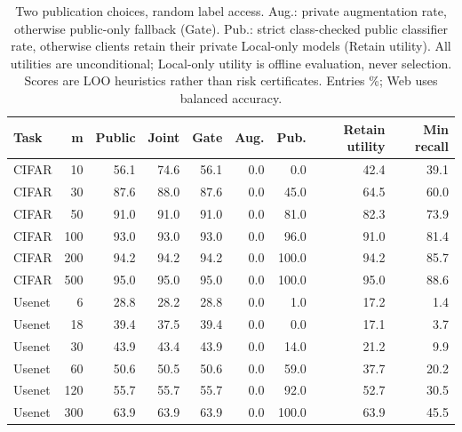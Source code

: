 \begin{table}[t]
\caption{Two publication choices, random label access. Aug.: private augmentation rate, otherwise public-only fallback (Gate). Pub.: strict class-checked public classifier rate, otherwise clients retain their private Local-only models (Retain utility). All utilities are unconditional; Local-only utility is offline evaluation, never selection. Scores are LOO heuristics rather than risk certificates. Entries \%; Web uses balanced accuracy.}
\label{tab:publication-gate}\small
\centering
\begin{tabular}{@{}lrrrrrrrr@{}}\toprule
Task & m & Public & Joint & Gate & Aug. & Pub. & Retain utility & Min recall \\
\midrule
CIFAR & 10 & 56.1 & 74.6 & 56.1 & 0.0 & 0.0 & 42.4 & 39.1 \\
CIFAR & 30 & 87.6 & 88.0 & 87.6 & 0.0 & 45.0 & 64.5 & 60.0 \\
CIFAR & 50 & 91.0 & 91.0 & 91.0 & 0.0 & 81.0 & 82.3 & 73.9 \\
CIFAR & 100 & 93.0 & 93.0 & 93.0 & 0.0 & 96.0 & 91.0 & 81.4 \\
CIFAR & 200 & 94.2 & 94.2 & 94.2 & 0.0 & 100.0 & 94.2 & 85.7 \\
CIFAR & 500 & 95.0 & 95.0 & 95.0 & 0.0 & 100.0 & 95.0 & 88.6 \\
Usenet & 6 & 28.8 & 28.2 & 28.8 & 0.0 & 1.0 & 17.2 & 1.4 \\
Usenet & 18 & 39.4 & 37.5 & 39.4 & 0.0 & 0.0 & 17.1 & 3.7 \\
Usenet & 30 & 43.9 & 43.4 & 43.9 & 0.0 & 14.0 & 21.2 & 9.9 \\
Usenet & 60 & 50.6 & 50.5 & 50.6 & 0.0 & 59.0 & 37.7 & 20.2 \\
Usenet & 120 & 55.7 & 55.7 & 55.7 & 0.0 & 92.0 & 52.7 & 30.5 \\
Usenet & 300 & 63.9 & 63.9 & 63.9 & 0.0 & 100.0 & 63.9 & 45.5 \\
\bottomrule\end{tabular}
\end{table}
